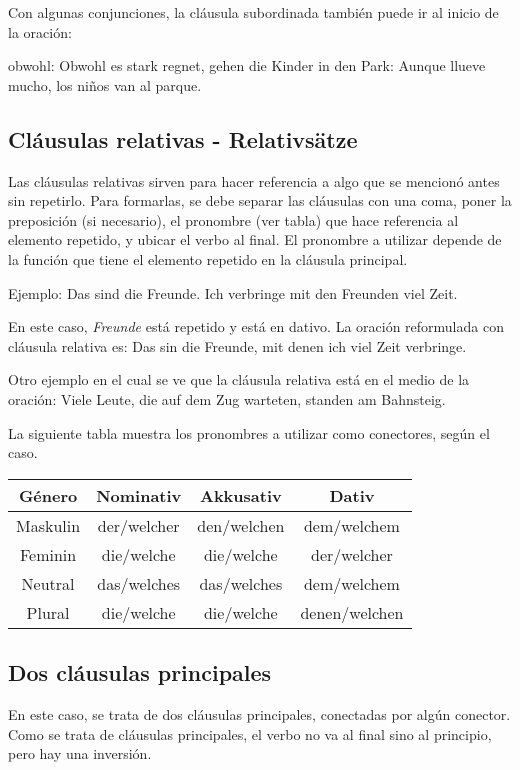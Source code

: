 Con algunas conjunciones, la cláusula subordinada también puede ir al inicio de la oración:
\begin{myitemize}
\item obwohl: Obwohl es stark regnet, gehen die Kinder in den Park: Aunque llueve mucho, los niños van al parque.
\end{myitemize}

\subsection{Cláusulas relativas - Relativsätze}
Las cláusulas relativas sirven para hacer referencia a algo que se mencionó antes sin repetirlo. Para formarlas, se debe separar las cláusulas con una coma, poner la preposición (si necesario), el pronombre (ver tabla) que hace referencia al elemento repetido, y ubicar el verbo al final. El pronombre a utilizar depende de la función que tiene el elemento repetido en la cláusula principal.

Ejemplo: Das sind die Freunde. Ich verbringe mit den Freunden viel Zeit. 

En este caso, \textit{Freunde} está repetido y está en dativo. La oración reformulada con cláusula relativa es: Das sin die Freunde, mit denen ich viel Zeit verbringe.

Otro ejemplo en el cual se ve que la cláusula relativa está en el medio de la oración: Viele Leute, die auf dem Zug warteten, standen am Bahnsteig.


La siguiente tabla muestra los pronombres a utilizar como conectores, según el caso.

\begin{tabular}{|c | c | c | c |}
\hline
\textbf{Género} & \textbf{Nominativ} & \textbf{Akkusativ} & \textbf{Dativ}\\
\hline
Maskulin & der/welcher & den/welchen & dem/welchem  \\
Feminin  & die/welche  & die/welche  & der/welcher \\
Neutral  & das/welches & das/welches & dem/welchem \\
Plural   & die/welche  & die/welche  & denen/welchen \\
\hline
\end{tabular}

\subsection{Dos cláusulas principales}
En este caso, se trata de dos cláusulas principales, conectadas por algún conector. Como se trata de cláusulas principales, el verbo no va al final sino al principio, pero hay una inversión.

